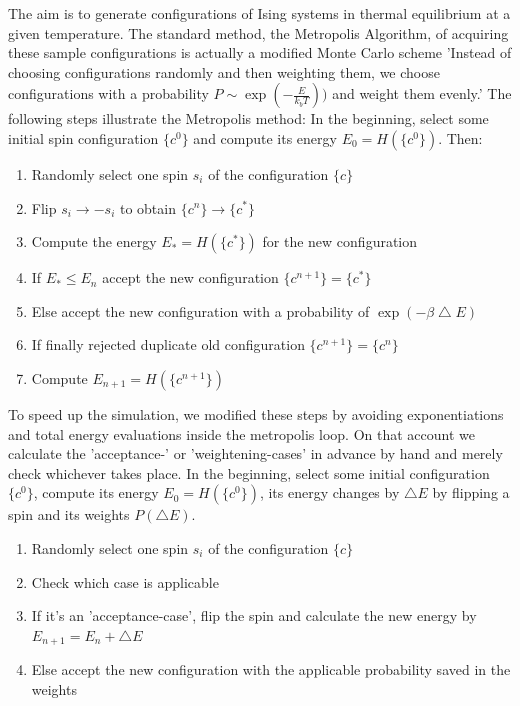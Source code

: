 \documentclass[12pt,a4paper,titlepage]{article}
\begin{document}
The aim is to generate configurations of Ising systems in thermal equilibrium at a given temperature. The standard method, the Metropolis Algorithm, of acquiring these sample configurations is actually a modified Monte Carlo scheme 'Instead of choosing configurations randomly and then weighting them, we choose configurations with a probability $P\sim \exp(-\frac{E}{k_b T}))$ and weight them evenly.'\cite{metropolis}\newline
The following steps illustrate the Metropolis method:\newline
In the beginning, select some initial spin configuration $\{c^0\}$ and compute its energy $E_0 = H(\{c^0\})$.
Then:


\begin{enumerate}
\item Randomly select one spin $s_i$ of the configuration $\{c\}$
\item Flip $s_i \rightarrow -s_i$ to obtain $\{c^n\} \rightarrow \{c^*\}$
\item Compute the energy $E_*=H(\{c^*\})$ for the new configuration
\item If $E_*\leq E_n$ accept the new configuration $\{c^{n+1}\} = \{c^*\}$
\item Else accept the new configuration with a probability of $\exp(-\beta \bigtriangleup E)$
\item If finally rejected duplicate old configuration $\{c^{n+1}\} = \{c^n\}$
\item Compute $E_{n+1} = H(\{c^{n+1}\})$
\end{enumerate}

To speed up the simulation, we modified these steps by avoiding exponentiations and total energy evaluations inside the metropolis loop.
On that account we calculate the 'acceptance-' or 'weightening-cases' in advance by hand and merely check whichever takes place.
In the beginning, select some initial configuration $\{c^0\}$, compute its energy $E_0 = H(\{c^0\})$, its energy changes by $\bigtriangleup E$ by flipping a spin and its weights $P(\bigtriangleup E)$.
\begin{enumerate}
\item Randomly select one spin $s_i$ of the configuration $\{c\}$
\item Check which case is applicable
\item If it's an 'acceptance-case', flip the spin and calculate the new energy by $E_{n+1} = E_n + \bigtriangleup E$
\item Else accept the new configuration with the applicable probability saved in the weights
\end{enumerate}
\end{document}
